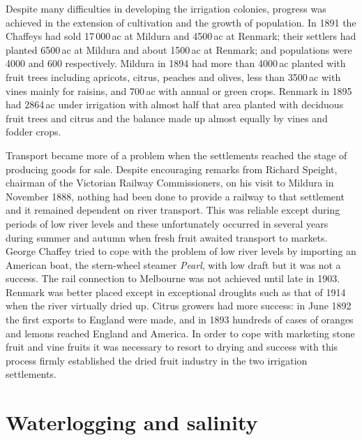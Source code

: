 Despite many difficulties in developing the irrigation colonies,
progress was achieved in the extension of cultivation and the growth
of population.  In 1891 the Chaffeys had sold 17\,000\,ac at Mildura
and 4500\,ac at Renmark; their settlers had planted 6500\,ac at
Mildura and about 1500\,ac at Renmark; and populations were 4000 and
600 respectively.  Mildura in 1894 had more than 4000\,ac planted with
fruit trees including apricots, citrus, peaches and olives, less than
3500\,ac with vines mainly for raisins, and 700\,ac with annual or
green crops.  Renmark in 1895 had 2864\,ac under irrigation with
almost half that area planted with deciduous fruit trees and citrus
and the balance made up almost equally by vines and fodder
crops.

Transport became more of a problem when the settlements reached the
stage of producing goods for sale.  Despite encouraging remarks from
Richard Speight, chairman of the Victorian Railway Commissioners, on
his visit to Mildura in November 1888, nothing had been done to
provide a railway to that settlement and it remained dependent on
river transport.  This was reliable except during periods of low river
levels and these unfortunately occurred in several years during summer
and autumn when fresh fruit awaited transport to markets.  George
Chaffey tried to cope with the problem of low river levels by
importing an American boat, the stern-wheel steamer
\textsl{Pearl}, with low draft but it was not a success.
The rail connection to Melbourne was not achieved until late in 1903.
Renmark was better placed except in exceptional droughts such as that
of 1914 when the river virtually dried up.  Citrus growers had more
success: in June 1892 the first exports to England were made, and in
1893 hundreds of cases of oranges and lemons reached England and
America.  In order to cope with marketing stone fruit and vine fruits
it was necessary to resort to drying and success with this process
firmly established the dried fruit industry in the two irrigation
settlements.

\section*{Waterlogging and salinity}

